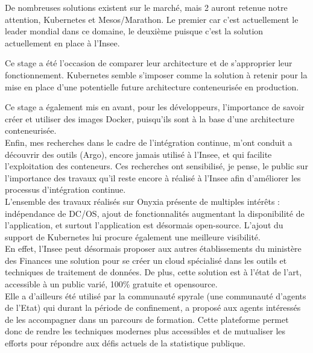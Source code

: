\documentclass[11pt,fleqn]{book} %
\begin{document}
De nombreuses solutions existent sur le marché, mais 2 auront retenue notre attention, Kubernetes et Mesos/Marathon. Le premier car c'est actuellement le leader mondial dans ce domaine, le deuxième puisque c'est la solution actuellement en place à l'Insee. \newline

Ce stage a été l'occasion de comparer leur architecture et de s'approprier leur fonctionnement. Kubernetes semble s'imposer comme la solution à retenir pour la mise en place d'une potentielle future architecture conteneurisée en production.\newline

Ce stage a également mis en avant, pour les développeurs, l'importance  de savoir créer et utiliser des images Docker, puisqu'ils sont à la base d'une architecture conteneurisée.\\

Enfin, mes recherches dans le cadre de l'intégration continue, m'ont conduit a découvrir des outils (Argo), encore jamais utilisé à l'Insee, et qui facilite l'exploitation des conteneurs. Ces recherches ont sensibilisé, je pense, le public sur l'importance des travaux qu'il reste encore à réalisé à l'Insee afin d'améliorer les processus d'intégration continue.\\

L'ensemble des travaux réalisés sur Onyxia présente de multiples intérêts : indépendance de DC/OS, ajout de fonctionnalités augmentant la disponibilité de l'application, et surtout l'application est désormais open-source. L'ajout du support de Kubernetes lui procure également une meilleure visibilité.\\


En effet, l'Insee peut désormais proposer aux autres établissements du ministère des Finances une solution pour se créer un cloud spécialisé dans les outils et techniques de traitement de données. De plus, cette solution est à l’état de l’art, accessible à un public varié, 100\% gratuite et opensource.\\

Elle a d'ailleurs été utilisé par la communauté spyrale (une communauté d'agents de l'Etat) qui durant la période de confinement, a proposé aux agents intéressés de les accompagner dans un parcours de formation. Cette plateforme permet donc de rendre les techniques modernes plus accessibles et de mutualiser les efforts pour répondre aux défis actuels de la statistique publique.\\
\end{document}
